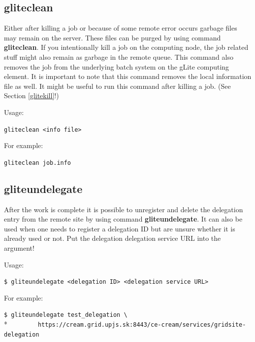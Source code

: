 \documentclass{article}
\begin{document}
\subsection{gliteclean}
\label{gliteclean}
Either after killing a job or because of some remote error occurs garbage files may remain on the server. These files can be purged by using command \textbf{gliteclean}. If you intentionally kill a job on the computing node, the job related stuff might also remain as garbage in the remote queue. This command also removes the job from the underlying batch system on the gLite computing element. It is important to note that this command removes the local information file as well. It might be useful to run this command after killing a job. (See Section \ref{glitekill}!)\par
Usage:
\begin{shaded}\verb#gliteclean <info file>#\end{shaded}
For example:
\begin{shaded}\verb#gliteclean job.info#\end{shaded}
\subsection{gliteundelegate}
\label{gliteundelegate}
After the work is complete it is possible to unregister and delete the delegation entry from the remote site by using command \textbf{gliteundelegate}. It can also be used when one needs to register a delegation ID but are unsure whether it is already used or not. Put the delegation delegation service URL into the argument!\par
Usage:
\begin{shaded}\verb#$ gliteundelegate <delegation ID> <delegation service URL>#\end{shaded}
For example:
\begin{shaded}\verb#$ gliteundelegate test_delegation \#\\*
\verb#        https://cream.grid.upjs.sk:8443/ce-cream/services/gridsite-delegation#\end{shaded}
\end{document}
